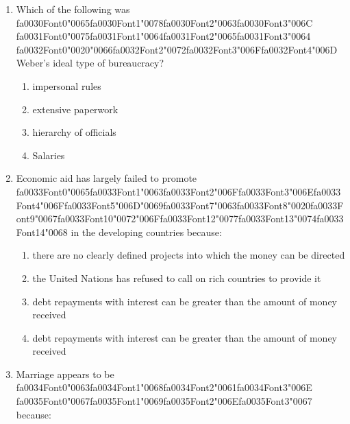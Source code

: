 \documentclass[12pt]{article}
\begin{document}
\begin{enumerate}[label=\arabic*.]
\begin{enumerate}[label=(\alph*)]
    \item their male partners pressurize them to look like supermodels
\end{enumerate}
\item Which of the following was {\csname fa0030Font0\endcsname\char"0065}{\csname fa0030Font1\endcsname\char"0078}{\csname fa0030Font2\endcsname\char"0063}{\csname fa0030Font3\endcsname\char"006C} {\csname fa0031Font0\endcsname\char"0075}{\csname fa0031Font1\endcsname\char"0064}{\csname fa0031Font2\endcsname\char"0065}{\csname fa0031Font3\endcsname\char"0064} {\csname fa0032Font0\endcsname\char"0020}{\char"0066}{\csname fa0032Font2\endcsname\char"0072}{\csname fa0032Font3\endcsname\char"006F}{\csname fa0032Font4\endcsname\char"006D} Weber's ideal type of bureaucracy?
\begin{enumerate}[label=(\alph*)]
    \item impersonal rules
    \item extensive paperwork
    \item hierarchy of officials
    \item Salaries
\end{enumerate}
\item Economic aid has largely failed to promote {\csname fa0033Font0\endcsname\char"0065}{\csname fa0033Font1\endcsname\char"0063}{\csname fa0033Font2\endcsname\char"006F}{\csname fa0033Font3\endcsname\char"006E}{\csname fa0033Font4\endcsname\char"006F}{\csname fa0033Font5\endcsname\char"006D}{\char"0069}{\csname fa0033Font7\endcsname\char"0063}{\csname fa0033Font8\endcsname\char"0020}{\csname fa0033Font9\endcsname\char"0067}{\csname fa0033Font10\endcsname\char"0072}{\char"006F}{\csname fa0033Font12\endcsname\char"0077}{\csname fa0033Font13\endcsname\char"0074}{\csname fa0033Font14\endcsname\char"0068} in the developing countries because:
\begin{enumerate}[label=(\alph*)]
    \item there are no clearly defined projects into which the money can be directed
    \item the United Nations has refused to call on rich countries to provide it
    \item debt repayments with interest can be greater than the amount of money received
    \item debt repayments with interest can be greater than the amount of money received
\end{enumerate}
\item Marriage appears to be {\csname fa0034Font0\endcsname\char"0063}{\csname fa0034Font1\endcsname\char"0068}{\csname fa0034Font2\endcsname\char"0061}{\csname fa0034Font3\endcsname\char"006E} {\csname fa0035Font0\endcsname\char"0067}{\csname fa0035Font1\endcsname\char"0069}{\csname fa0035Font2\endcsname\char"006E}{\csname fa0035Font3\endcsname\char"0067} because:

\end{enumerate}
\end{document}
